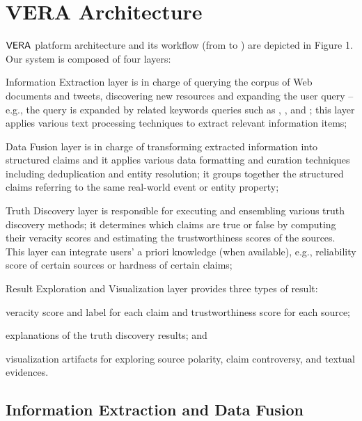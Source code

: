 \section{VERA Architecture}


$\mathsf{VERA}$ platform architecture and its workflow (from  to ) are depicted in Figure 1. Our system is composed of four layers:
\begin{inparaenum}[(1)]
\item Information Extraction layer is in charge of querying the corpus of Web documents and tweets, discovering new resources and expanding the user query --e.g., the query  is expanded by related keywords queries such as  ,
, and ; this layer applies various text processing techniques to extract relevant information items; 
\item Data Fusion layer is in charge of   transforming extracted information  into structured claims and it applies various data formatting and curation techniques including deduplication and entity resolution; it groups together the structured claims referring to the same real-world event or entity property; 
\item Truth Discovery layer is responsible for executing and ensembling various truth discovery methods; it determines  which claims are true or false by computing their veracity scores and estimating the trustworthiness scores of the sources. This layer can integrate users' a priori knowledge (when available), e.g., reliability score of certain sources or  hardness of certain claims;
\item Result Exploration and Visualization layer provides three  types of result: 
\begin{inparaenum}[(i)]
\item veracity score and label for each claim and trustworthiness score for each source; 
\item explanations of the truth discovery results; and
\item visualization artifacts for exploring source polarity, claim controversy, and textual evidences.
\end{inparaenum}
\end{inparaenum}

\subsection{Information Extraction and Data Fusion}\label{openie}

